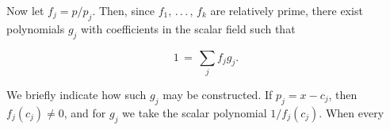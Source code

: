 Now let \(f_{j}=p/p_{j}\). Then, since \(f_{1},\,.\,.\,.\,,\,f_{k}\) are relatively prime, there exist polynomials \(g_{j}\) with coefficients in the scalar field such that

\[1\,=\,\sum_{j}f_{j}g_{j}.\]

We briefly indicate how such \(g_{j}\) may be constructed. If \(p_{j}=x-c_{j}\), then \(f_{j}(c_{j})\neq 0\), and for \(g_{j}\) we take the scalar polynomial \(1/f_{j}(c_{j})\). When every 